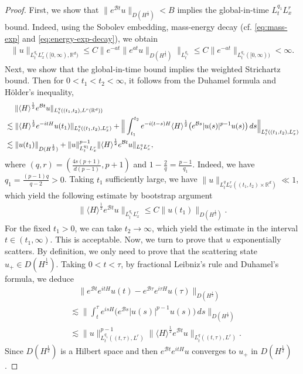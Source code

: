 \documentclass[10pt%
]{amsart}
\numberwithin{equation}{section}
\newcommand{\R}{\mathbb{R}}
\theoremstyle{definition}
\def\<{{\langle}}
\def\>{{\rangle}}
\begin{document}
\begin{proof}
	First, we show that $\|e^{\mathcal Bt}u\|_{D(H^\frac{1}{2})}<B$ implies the global-in-time $L_t^{q_1} L_x^r$ bound. Indeed, using the Sobolev embedding, mass-energy  decay (cf. \eqref{eq:mass-exp} and \eqref{eq:energy-exp-decay}), we obtain
	\begin{align*}
		\|u\|_{L_t^{q_1}L_x^r([0,\infty),\R^d)}\leq C\|e^{-at}\|e^{at}u\|_{D(H^\frac12)}\|_{L_t^{q_1}}\leq C\|e^{-at}\|_{L_t^{q_1}([0,\infty))}<\infty.
	\end{align*}
	Next, we show that the global-in-time bound  implies the weighted Strichartz bound.  Then for $0<t_1<t_2<\infty$, it follows from the Duhamel formula and H\"older's inequality,
	\begin{align*}
		&\hspace{3ex}\|\<H\>^\frac12e^{\mathcal Bt}u\|_{ L_t^q((t_1,t_2),L^r(\R^d))}\\&\lesssim\|\<H\>^\frac12e^{-itH}u(t_1)\|_{L_t^q((t_1,t_2),L_x^r)}+\Big\|\int_{t_1}^{t_2}e^{-i(t-s)H}\<H\>^\frac12\big(e^{\mathcal Bs}|u(s)|^{p-1}u(s)\big)\,ds\Big\|_{L_t^q((t_1,t_2),L_x^r)}\\
		&\lesssim\|u(t_1)\|_{D(H^\frac12)}+\|u\|_{L_t^{q_1}L_x^r}^{p-1}\|\<H\>^\frac12e^{\mathcal Bt}u\|_{L_t^qL_x^r},
	\end{align*}
	where $(q,r)=(\frac{4s(p+1)}{d(p-1)},p+1)$ and  $1-\frac{2}{q}=\frac{p-1}{q_1}$. Indeed, we have $q_1=\frac{(p-1)q}{q-2}>0$.
	Taking $t_1$ sufficiently large, we have $\|u\|_{L_t^qL_x^r((t_1,t_2)\times\R^d)}\ll1$, which yield the following estimate by bootstrap argument
	\begin{align*}
		\|\<H\>^\frac12e^{\mathcal Bt}u\|_{L_t^{q_1} L_x^r}\leq C\|u(t_1)\|_{D(H^\frac{1}{2})}.
	\end{align*}
	For the fixed $t_1>0$, we can take $t_2\to\infty$, which yield the estimate in the interval $t\in(t_1,\infty)$. This is acceptable. Now, we turn to prove that $u$ exponentially scatters. By definition, we only need to prove that the scattering state $u_+\in D(H^\frac12)$. Taking $0<t<\tau$, by fractional Leibniz's rule and Duhamel's formula, we deduce 
	\begin{align*}
		&\quad\Big \|e^{\mathcal Bt}e^{itH}u(t)-e^{\mathcal B\tau}e^{i\tau H}u(\tau)\Big\|_{D(H^\frac{1}{2})}\\
		&\lesssim\Big\|\int_t^\tau e^{isH}\big(e^{\mathcal Bs}|u(s)|^{p-1}u(s)\big)\,ds\Big\|_{D(H^\frac{1}{2})}\\
		&\lesssim\|u\|_{L_t^{q_1}((t,\tau),L^r)}^{p-1}\|\<H\>^\frac12e^{\mathcal Bt}u\|_{L_t^q((t,\tau),L^r)}.
	\end{align*}  
	Since $D(H^\frac{1}{2})$ is a Hilbert space and then $e^{\mathcal Bt}e^{itH}u$ converges to $u_+$ in $D(H^\frac12)$.
\end{proof}
\end{document}
